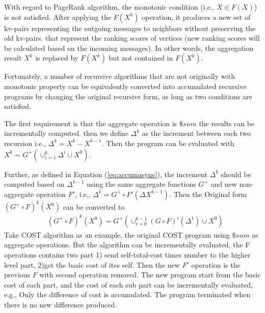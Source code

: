 With regard to PageRank algorithm, the monotonic condition (i.e., $X\in F(X)$) is not satisfied. After applying the $F(X^{k})$ operation, it produces a new set of kv-pairs representing the outgoing messages to neighbors  without preserving the old kv-pairs. {\color{green}that represent the ranking scores of vertices} (new ranking scores will be calculated based on the incoming messages). In other words, the aggregation result $X^{k}$ is replaced by $F(X^{k})$ but not contained in $F(X^{k})$.

Fortunately, a number of recursive algorithms that are not originally with monotonic property can be equivalently converted into accumulated recursive programs by changing the original recursive form, as long as two conditions are satisfied.


{\color{red}
	
	The first requirement is that{\color{blue} the aggregate operation is $\$sum$ } the results can be incrementally computed. then we define $\Delta^{k}$ as the increment between each two recursion i.e., $\Delta^{k}=X^k-X^{k-1}$. Then the program can be evaluated with $X^k=G^+(\cup_{i=1}^{k}\Delta^i\cup X^0)$.
	
	Further, as defined in Equation (\ref{eq:accumasync}), the increment $\Delta^{k}$ should be computed based on $\Delta^{k-1}$ using the same aggregate functions $G^+$ and new non-aggregate operation $F'$, i.e., $\Delta^{k}=G^+\circ F'(\Delta X^{k-1})$.
	Then the Original form $(G^+\circ F)^k(X^0)$ can be converted to 
	\begin{equation}
	\label{eq:convertform}
	\begin{aligned}
	&(G^+\circ F)^k(X^0)
	=G^+( \cup_{i=0}^{k-1}{(G\circ F)^i(\Delta^{1})\cup X^0})
	\end{aligned}
	\end{equation}
Take COST algorithm as an example, the original COST program using $\$sum$ as aggregate operations. But the algorithm can be incrementally evaluated, the F operations contains two part 1) send self-total-cost times number to the higher level part, 2)get the basic cost of ites self.  Then the new $F'$ operation is the previous $F$ with second operation removed. The new program start from the basic cost of each part, and the cost of each sub part can be incrementally evaluated, e.g., Only the difference of cost is accumulated. The program terminated when there is no new difference produced.
	
}
